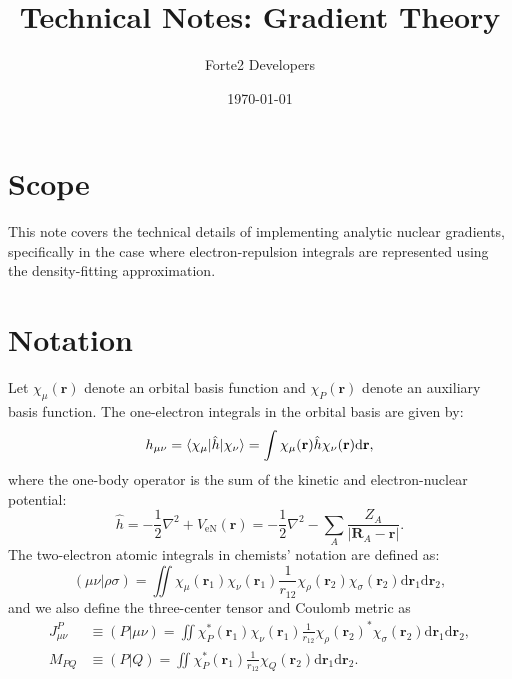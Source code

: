 \documentclass[aip,preprint]{revtex4-1}
\newcommand{\dd}{\mathrm{d}}
\begin{document}
\title{Technical Notes: Gradient Theory}

\author{Forte2 Developers}

\date{\today}

\maketitle

\section{Scope}
This note covers the technical details of implementing analytic nuclear gradients, specifically in the case where electron-repulsion integrals are represented using the density-fitting approximation. 

\section{Notation}
Let $\chi_\mu(\mathbf{r})$ denote an orbital basis function and $\chi_P(\mathbf{r})$ denote an auxiliary
basis function.
The one-electron integrals in the orbital basis are given by:
\begin{equation}
h_{\mu \nu}
= \braket{\chi_\mu|\hat{h}|\chi_\nu}
= \int
\chi_\mu(\mathbf{r})
\hat{h}
\chi_\nu(\mathbf{r})\dd\mathbf{r},
\end{equation}
where the one-body operator is the sum of the kinetic and electron-nuclear potential:
\begin{equation}
\hat{h} = - \frac{1}{2} \nabla^2 + V_\mathrm{eN}(\mathbf{r})
= - \frac{1}{2} \nabla^2 - \sum_{A} \frac{Z_A}{|\mathbf{R}_A - \mathbf{r}|}.
\end{equation}
The two-electron atomic integrals in chemists' notation are defined as:
\begin{equation}
(\mu\nu|\rho\sigma)
= \iint
\chi_\mu(\mathbf{r}_1)\chi_\nu(\mathbf{r}_1)
\frac{1}{r_{12}}
\chi_\rho(\mathbf{r}_2)\chi_\sigma(\mathbf{r}_2)
\dd\mathbf{r}_1\dd\mathbf{r}_2,
\end{equation}
and we also define the three-center tensor and Coulomb metric as
\begin{align}
J^P_{\mu\nu} &\equiv (P|\mu\nu) = \iint
\chi_P^*(\mathbf{r}_1)\chi_\nu(\mathbf{r}_1)
\frac{1}{r_{12}}
\chi_\rho(\mathbf{r}_2)^*\chi_\sigma(\mathbf{r}_2)
\dd\mathbf{r}_1\dd\mathbf{r}_2 , \\
M_{PQ} &\equiv (P|Q) = \iint
\chi_P^*(\mathbf{r}_1)
\frac{1}{r_{12}}
\chi_Q(\mathbf{r}_2)
\dd\mathbf{r}_1\dd\mathbf{r}_2.
\end{align}
\end{document}

